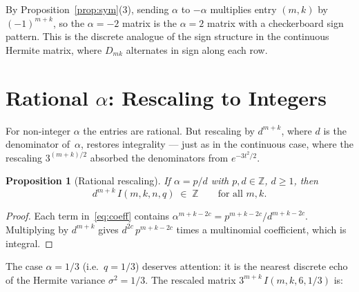 \documentclass[11pt,a4paper]{article}
\theoremstyle{plain}
\newtheorem{proposition}[theorem]{Proposition}
\theoremstyle{definition}
\begin{document}
By Proposition~\ref{prop:sym}(3), sending $\alpha$ to $-\alpha$
multiplies entry $(m,k)$ by $(-1)^{m+k}$, so the $\alpha = -2$
matrix is the $\alpha = 2$ matrix with a checkerboard sign pattern.
This is the discrete analogue of the sign structure in the continuous
Hermite matrix, where $D_{mk}$ alternates in sign along each row.

\section{Rational $\alpha$: Rescaling to Integers}

For non-integer $\alpha$ the entries are rational. But rescaling
by $d^{m+k}$, where $d$ is the denominator of~$\alpha$, restores
integrality --- just as in the continuous case, where the rescaling
$3^{(m+k)/2}$ absorbed the denominators from $e^{-3t^2/2}$.

\begin{tcolorbox}[colback=black!5, colframe=black!5, boxrule=0pt,
  sharp corners]
\begin{proposition}[Rational rescaling]\label{prop:rational}
If $\alpha = p/d$ with $p, d \in \mathbb{Z}$, $d \ge 1$, then
\[
  d^{m+k}\, I(m, k, n, q) \;\in\; \mathbb{Z}
  \qquad\text{for all } m, k.
\]
\end{proposition}
\end{tcolorbox}

\begin{proof}
Each term in~\eqref{eq:coeff} contains $\alpha^{m+k-2c}
= p^{m+k-2c}/d^{m+k-2c}$. Multiplying by $d^{m+k}$ gives
$d^{2c}\, p^{m+k-2c}$ times a multinomial coefficient, which is
integral.
\end{proof}

The case $\alpha = 1/3$ (i.e.\ $q = 1/3$) deserves attention:
it is the nearest discrete echo of the Hermite variance
$\sigma^2 = 1/3$. The rescaled matrix $3^{m+k}\, I(m,k,6,1/3)$ is:
\end{document}
